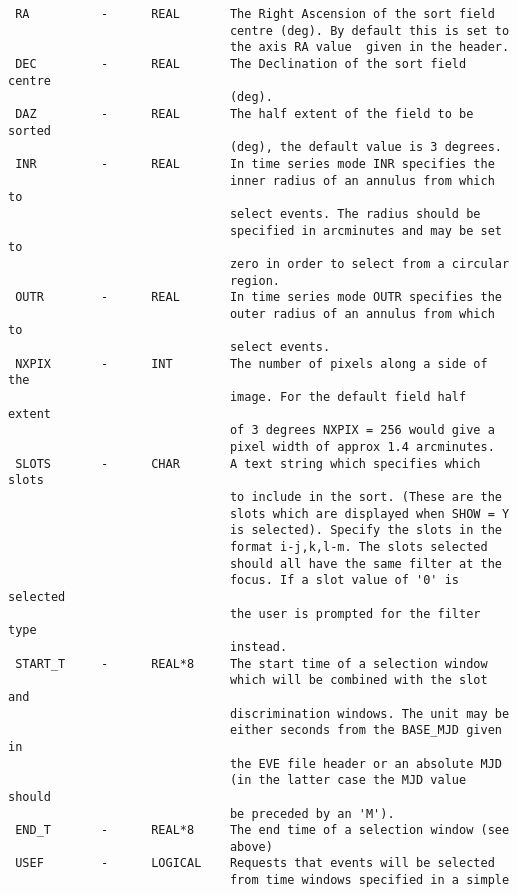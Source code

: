 \documentclass{book}
\renewcommand{\_}{{\tt\char'137}}     %
\begin{document}
\begin{verbatim}
 RA          -      REAL       The Right Ascension of the sort field
                               centre (deg). By default this is set to
                               the axis RA value  given in the header.
 DEC         -      REAL       The Declination of the sort field centre
                               (deg).
 DAZ         -      REAL       The half extent of the field to be sorted
                               (deg), the default value is 3 degrees.
 INR         -      REAL       In time series mode INR specifies the
                               inner radius of an annulus from which to
                               select events. The radius should be
                               specified in arcminutes and may be set to
                               zero in order to select from a circular
                               region.
 OUTR        -      REAL       In time series mode OUTR specifies the
                               outer radius of an annulus from which to
                               select events.
 NXPIX       -      INT        The number of pixels along a side of the
                               image. For the default field half extent
                               of 3 degrees NXPIX = 256 would give a
                               pixel width of approx 1.4 arcminutes.
 SLOTS       -      CHAR       A text string which specifies which slots
                               to include in the sort. (These are the
                               slots which are displayed when SHOW = Y
                               is selected). Specify the slots in the
                               format i-j,k,l-m. The slots selected
                               should all have the same filter at the
                               focus. If a slot value of '0' is selected
                               the user is prompted for the filter type
                               instead.
 START_T     -      REAL*8     The start time of a selection window
                               which will be combined with the slot and
                               discrimination windows. The unit may be
                               either seconds from the BASE_MJD given in
                               the EVE file header or an absolute MJD
                               (in the latter case the MJD value should
                               be preceded by an 'M').
 END_T       -      REAL*8     The end time of a selection window (see
                               above)
 USEF        -      LOGICAL    Requests that events will be selected
                               from time windows specified in a simple

\end{verbatim}
\end{document}
